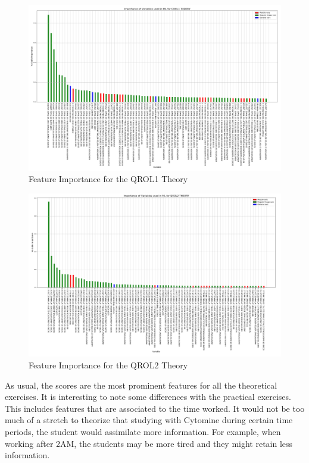 \documentclass[a4paper,11pt]{report}
\numberwithin{figure}{chapter} %
\begin{document}
      \begin{figure}[H]
      \centering
      \includegraphics[width=.95\linewidth]{plots/var_importance_QROL1_THEORY_2018-05-02_20_54_23.png}
      \caption{Feature Importance for the QROL1 Theory}
      \label{fig:var_th2}
      \end{figure}

      \begin{figure}[H]
      \centering
      \includegraphics[width=.95\linewidth]{plots/var_importance_QROL2_THEORY_2018-05-02_20_53_44.png}
      \caption{Feature Importance for the QROL2 Theory}
      \label{fig:var_th3}
      \end{figure}

    As usual, the scores are the most prominent features for all the theoretical exercises.
    It is interesting to note some differences with the practical exercises.
    This includes features that are associated to the time worked.
    It would not be too much of a stretch to theorize that studying with Cytomine during certain time periods, the student would assimilate more information.
    For example, when working after 2AM, the students may be more tired and they might retain less information.\\
\end{document}
